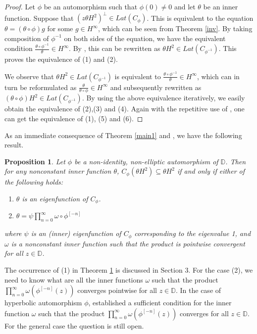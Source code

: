 \documentclass[12pt, reqno]{amsart}
\newtheorem{proposition}[theorem]{Proposition}
\theoremstyle{definition}
\numberwithin{equation}{section}
\begin{document}
\begin{proof}

Let $\phi$ be an automorphism such that $\phi(0)\neq0$ and let $\theta$ be an inner function. Suppose that  $({z\theta H^2})^\perp \in Lat (C_\phi)$. This is equivalent to the equation $\theta =(\theta \circ \phi) g$ for some $g \in H^\infty$, which can be seen from Theorem \ref{inv}. By taking composition  of $\phi^{-1}$ on both sides of the equation, we have the equivalent condition $\frac{\theta  \circ \phi^{-1} }{\theta}\in H^\infty$. By \cite[Theorem 2.3]{buerlingtype}, this can be rewritten as 
$ \theta  H^2 \in Lat(C_{\phi^{-1}})$. This proves the equivalence of (1) and (2).


We observe that 	$\theta H^2 \in Lat (C_{\phi^{-1}})$ is equivalent to $\frac{\theta  \circ \phi^{-1} }{\theta}\in H^\infty$, which can in turn be reformulated as $\frac{\theta  }{\theta  \circ \phi}\in H^\infty$ and subsequently rewritten as $ (\theta \circ \phi) H^2 \in Lat(C_{\phi^{-1}})$.
By using the above equivalence iteratively, we easily obtain the equivalence of (2),(3) and (4). Again with the repetitive use of  \cite[Theorem 2.3]{buerlingtype}, one can get the equivalence of (1), (5) and (6).


\end{proof}

As an immediate consequence  of  Theorem \ref{main1} and \cite[Theorem 4.1]{javad}, we have the following result.
\begin{proposition}\label{beurling}
	Let $\phi$ be a non-identity, non-elliptic automorphism of $\mathbb{D}$. Then for any nonconstant inner function $\theta$, $C_{\phi}(\theta H^2) \subseteq\theta H^2$ if and only if either of the following holds:
	\begin{enumerate}
		\item $\theta$ is an eigenfunction of $C_\phi$.  
		\item $\theta= \psi \prod\limits_{n=0}^{\infty}\omega\circ\phi^{[-n]}$
	\end{enumerate}
	where $\psi$ is an (inner) eigenfunction of $C_\phi$ corresponding to the eigenvalue 1, and $\omega $ is a nonconstant inner function such that the product is pointwise convergent for all $z \in \mathbb{D}$.
\end{proposition}

The occurrence of (1) in  Theorem \ref{beurling} is discussed in Section 3. For the case (2), we need to know what are all the inner functions $\omega$ such that  the product $\prod_{n=0}^{\infty}\omega(\phi^{[-n]}(z))$ converges  pointwise for all $z \in \mathbb{D}$. In the case of hyperbolic automorphism $\phi$, \cite[Lemma 3.1]{javad} established a sufficient condition for the inner function $\omega$ such that the product $\prod_{n=0}^{\infty}\omega(\phi^{[-n]}(z))$ converges for all $z \in \mathbb{D}$. For the general case the question is still open. 
\end{document}
